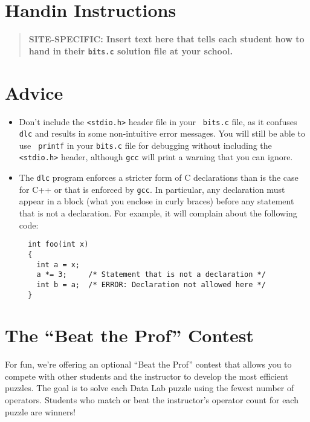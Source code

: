 \documentclass[11pt]{article}
\begin{document}
\section{Handin Instructions}

\begin{quote}
\bf SITE-SPECIFIC: Insert text here that tells each student how to
hand in their {\tt bits.c} solution file at your school.
\end{quote}

\section{Advice}

\begin{itemize}

\item Don't include the \verb:<stdio.h>: header file in your {\tt
bits.c} file, as it confuses \texttt{dlc} and results in some
non-intuitive error messages. You will still be able to use {\tt
printf} in your {\tt bits.c} file for debugging without including the
\verb:<stdio.h>: header, although \texttt{gcc} will print a warning that
you can ignore.

\item The \texttt{dlc} program enforces a stricter form of C declarations
than is the case for C++ or that is enforced by \texttt{gcc}.  In
particular, any declaration must appear in a block (what you enclose
in curly braces) before any statement that is not a declaration.  For
example, it will complain about the following code:
\begin{verbatim}
  int foo(int x)
  {
    int a = x;
    a *= 3;     /* Statement that is not a declaration */
    int b = a;  /* ERROR: Declaration not allowed here */
  }
\end{verbatim}

\end{itemize}

\section{The ``Beat the Prof'' Contest}

For fun, we're offering an optional ``Beat the Prof'' contest that
allows you to compete with other students and the instructor to
develop the most efficient puzzles. The goal is to solve each Data Lab
puzzle using the fewest number of operators. Students who match or
beat the instructor's operator count for each puzzle are winners!
\end{document}
